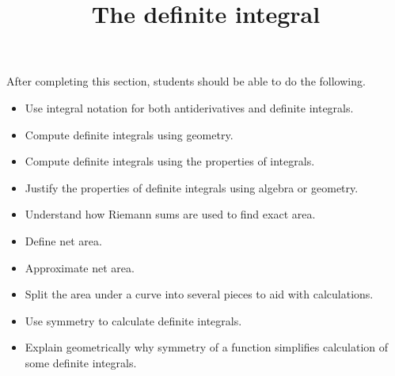 \documentclass{ximera}
\title{The definite integral}
\begin{document}
\begin{abstract}
\end{abstract}

\maketitle

\begin{sectionOutcomes}

After completing this section, students should be able to do the following.

\begin{itemize}
\item Use integral notation for both antiderivatives and definite integrals.
\item Compute definite integrals using geometry.
\item Compute definite integrals using the properties of integrals.
\item Justify the properties of definite integrals using algebra or geometry.
\item Understand how Riemann sums are used to find exact area.
\item Define net area.
\item Approximate net area.
\item Split the area under a curve into several pieces to aid with calculations.
\item Use symmetry to calculate definite integrals.
\item Explain geometrically why symmetry of a function simplifies calculation of some definite integrals.
\end{itemize}

\end{sectionOutcomes}
\end{document}
